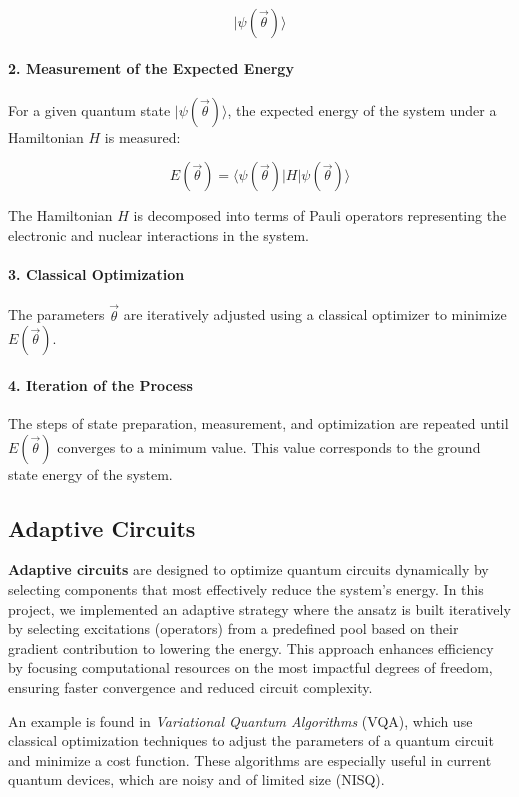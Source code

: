 \[
|\psi(\vec{\theta})\rangle
\]

\paragraph{2. Measurement of the Expected Energy}

For a given quantum state \(|\psi(\vec{\theta})\rangle\), the expected energy of the system under a Hamiltonian \(H\) is measured:

\[
E(\vec{\theta}) = \langle \psi(\vec{\theta}) | H | \psi(\vec{\theta}) \rangle
\]

The Hamiltonian \(H\) is decomposed into terms of Pauli operators representing the electronic and nuclear interactions in the system.

\paragraph{3. Classical Optimization}

The parameters \(\vec{\theta}\) are iteratively adjusted using a classical optimizer to minimize \(E(\vec{\theta})\).

\paragraph{4. Iteration of the Process}

The steps of state preparation, measurement, and optimization are repeated until \(E(\vec{\theta})\) converges to a minimum value. This value corresponds to the ground state energy of the system.

\subsection{Adaptive Circuits}

\textbf{Adaptive circuits} are designed to optimize quantum circuits dynamically by selecting components that most effectively reduce the system's energy. In this project, we implemented an adaptive strategy where the ansatz is built iteratively by selecting excitations (operators) from a predefined pool based on their gradient contribution to lowering the energy. This approach enhances efficiency by focusing computational resources on the most impactful degrees of freedom, ensuring faster convergence and reduced circuit complexity.

An example is found in \textit{Variational Quantum Algorithms} (VQA), which use classical optimization techniques to adjust the parameters of a quantum circuit and minimize a cost function. These algorithms are especially useful in current quantum devices, which are noisy and of limited size (NISQ).

